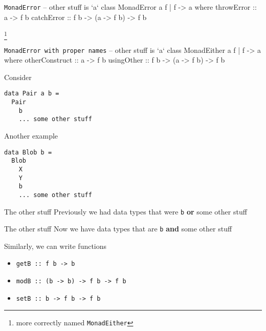\begin{frame}[fragile]
\begin{block}{\lstinline{MonadError}}
-- other stuff is `a`
class MonadError a f | f -> a where
  throwError :: a -> f b
  catchError :: f b -> (a -> f b) -> f b
\end{block}
\footnote{more correctly named \lstinline{MonadEither}}
\end{frame}

\begin{frame}[fragile]
\begin{block}{\lstinline{MonadError with proper names}}
-- other stuff is `a`
class MonadEither a f | f -> a where
  otherConstruct :: a -> f b
  usingOther :: f b -> (a -> f b) -> f b
\end{block}
\end{frame}

\begin{frame}[fragile]
\begin{block}{Consider}
\begin{lstlisting}[style=haskell]
data Pair a b =
  Pair
    b
    ... some other stuff
\end{lstlisting}
\end{block}
\end{frame}

\begin{frame}[fragile]
\begin{block}{Another example}
\begin{lstlisting}[style=haskell]
data Blob b =
  Blob
    X
    Y
    b
    ... some other stuff
\end{lstlisting}
\end{block}
\end{frame}

\begin{frame}[fragile]
\begin{block}{The other stuff}
Previously we had data types that were \lstinline{b} \textbf{or} some other stuff
\end{block}
\end{frame}

\begin{frame}[fragile]
\begin{block}{The other stuff}
Now we have data types that are \lstinline{b} \textbf{and} some other stuff
\end{block}
\end{frame}

\begin{frame}[fragile]
\begin{block}{Similarly, we can write functions}
\begin{itemize}
\item<1-> \lstinline{getB :: f b -> b}
\item<2-> \lstinline{modB :: (b -> b) -> f b -> f b}
\item<3-> \lstinline{setB :: b -> f b -> f b}
\end{itemize}
\end{block}
\end{frame}

